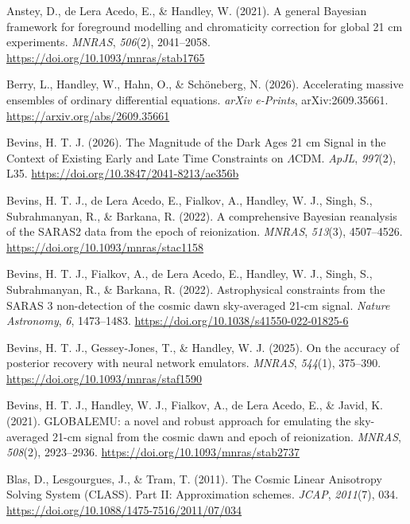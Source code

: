\documentclass[
]{article}
\newlength{\cslhangindent}
\newenvironment{CSLReferences}[2] %
 {\begin{list}{}{%
  \setlength{\itemindent}{0pt}
  \setlength{\leftmargin}{0pt}
  \setlength{\parsep}{0pt}
  \ifodd #1
   \setlength{\leftmargin}{\cslhangindent}
   \setlength{\itemindent}{-1\cslhangindent}
  \fi
  \setlength{\itemsep}{#2\baselineskip}}}
 {\end{list}}
\begin{document}
\protect{}\label{refs}
\begin{CSLReferences}{1}{0}
Anstey, D., de Lera Acedo, E., \& Handley, W. (2021). {A general
Bayesian framework for foreground modelling and chromaticity correction
for global 21 cm experiments}. \emph{MNRAS}, \emph{506}(2), 2041--2058.
\url{https://doi.org/10.1093/mnras/stab1765}

Berry, L., Handley, W., Hahn, O., \& Schöneberg, N. (2026).
{Accelerating massive ensembles of ordinary differential equations}.
\emph{arXiv e-Prints}, arXiv:2609.35661.
\url{https://arxiv.org/abs/2609.35661}

Bevins, H. T. J. (2026). {The Magnitude of the Dark Ages 21 cm Signal in
the Context of Existing Early and Late Time Constraints on
{\(\Lambda\)}CDM}. \emph{ApJL}, \emph{997}(2), L35.
\url{https://doi.org/10.3847/2041-8213/ae356b}

Bevins, H. T. J., de Lera Acedo, E., Fialkov, A., Handley, W. J., Singh,
S., Subrahmanyan, R., \& Barkana, R. (2022). {A comprehensive Bayesian
reanalysis of the SARAS2 data from the epoch of reionization}.
\emph{MNRAS}, \emph{513}(3), 4507--4526.
\url{https://doi.org/10.1093/mnras/stac1158}

Bevins, H. T. J., Fialkov, A., de Lera Acedo, E., Handley, W. J., Singh,
S., Subrahmanyan, R., \& Barkana, R. (2022). {Astrophysical constraints
from the SARAS 3 non-detection of the cosmic dawn sky-averaged 21-cm
signal}. \emph{Nature Astronomy}, \emph{6}, 1473--1483.
\url{https://doi.org/10.1038/s41550-022-01825-6}

Bevins, H. T. J., Gessey-Jones, T., \& Handley, W. J. (2025). {On the
accuracy of posterior recovery with neural network emulators}.
\emph{MNRAS}, \emph{544}(1), 375--390.
\url{https://doi.org/10.1093/mnras/staf1590}

Bevins, H. T. J., Handley, W. J., Fialkov, A., de Lera Acedo, E., \&
Javid, K. (2021). {GLOBALEMU: a novel and robust approach for emulating
the sky-averaged 21-cm signal from the cosmic dawn and epoch of
reionization}. \emph{MNRAS}, \emph{508}(2), 2923--2936.
\url{https://doi.org/10.1093/mnras/stab2737}

Blas, D., Lesgourgues, J., \& Tram, T. (2011). {The Cosmic Linear
Anisotropy Solving System (CLASS). Part II: Approximation schemes}.
\emph{JCAP}, \emph{2011}(7), 034.
\url{https://doi.org/10.1088/1475-7516/2011/07/034}


\end{CSLReferences}
\end{document}

